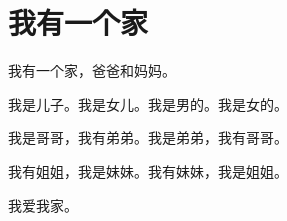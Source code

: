 \documentclass[12pt,UTF-8,openany]{ctexbook}
\begin{document}
\hanzibox{}\hanzibox{}\hanzibox{}\hanzibox{}\hspace{1em}\hanzibox{}\hanzibox{}\hanzibox{}\hanzibox{}

\hanzibox{}\hanzibox{}\hanzibox{}\hanzibox{}\hspace{1em}\hanzibox{}\hanzibox{}\hanzibox{}\hanzibox{}

\hanzibox{}\hanzibox{}\hanzibox{}\hanzibox{}\hspace{1em}\hanzibox{}\hanzibox{}\hanzibox{}\hanzibox{}

\hanzibox{}\hanzibox{}\hanzibox{}\hanzibox{}\hspace{1em}\hanzibox{}\hanzibox{}\hanzibox{}\hanzibox{}

\hanzibox{}\hanzibox{}\hanzibox{}\hanzibox{}\hspace{1em}




\chapter{我有一个家}

\begin{large}
    
    我有一个家，爸爸和妈妈。
    
    我是儿子。我是女儿。我是男的。我是女的。
    
    我是哥哥，我有弟弟。我是弟弟，我有哥哥。
    
    我有姐姐，我是妹妹。我有妹妹，我是姐姐。
    
    我爱我家。
    
\end{large}


\clearpage

\begin{center}
    
    
    
\end{center}


\hanzibox{}\hanzibox{}\hanzibox{}\hanzibox{}\hspace{1em}\hanzibox{}\hanzibox{}\hanzibox{}\hanzibox{}

\hanzibox{}\hanzibox{}\hanzibox{}\hanzibox{}\hspace{1em}\hanzibox{}\hanzibox{}\hanzibox{}\hanzibox{}
\end{document}
